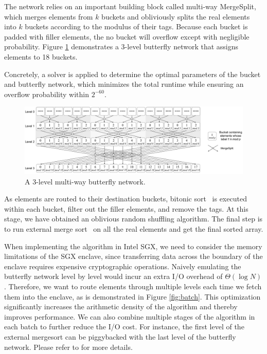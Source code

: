 \documentclass{article}
\begin{document}
The network relies on an important building block called multi-way {\sf MergeSplit}, which merges elements from $k$ buckets and obliviously splits the real elements into $k$ buckets according to the modulus of their tags. Because each bucket is padded with filler elements, the no bucket will overflow except with negligible probability. Figure \ref{fig:butterfly} demonstrates a 3-level butterfly network that assigns elements to 18 buckets.

Concretely, a solver is applied to determine the optimal parameters of the bucket and butterfly network, which minimizes the total runtime while ensuring an overflow probability within $2^{-60}$.

\begin{figure}[thbp]
    \centering
    \includegraphics[width=\textwidth]{assets/multi-way-butterfly.png}
    \caption{A 3-level multi-way butterfly network.}
    \label{fig:butterfly}
\end{figure}

As elements are routed to their destination buckets, bitonic sort~\cite{bitonicsort} is executed within each bucket, filter out the filler elements, and remove the tags. At this stage, we have obtained an oblivious random shuffling algorithm. The final step is to run external merge sort~\cite{knuthbook} on all the real elements and get the final sorted array.

When implementing the algorithm in Intel SGX, we need to consider the memory limitations of the SGX enclave, since transferring data across the boundary of the enclave requires expensive cryptographic operations. Naively emulating the butterfly network level by level would incur an extra I/O overhead of $\Theta(\log N)$. Therefore, we want to route elements through multiple levels each time we fetch them into the enclave, as is demonstrated in Figure \ref{fig:batch}. This optimization significantly increases the arithmetic density of the algorithm and thereby improves performance. We can also combine multiple stages of the algorithm in each batch to further reduce the I/O cost. For instance, the first level of the external mergesort can be piggybacked with the last level of the butterfly network. Please refer to \cite{osort} for more details.
\end{document}
